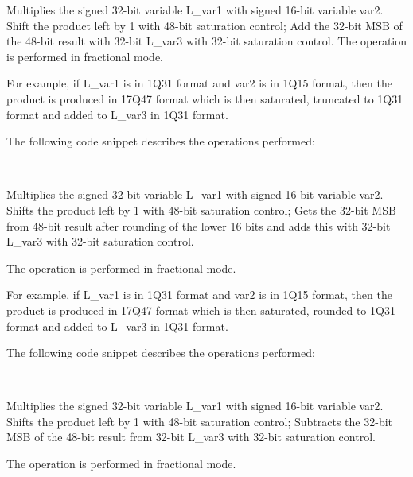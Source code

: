 
Multiplies the signed 32-bit variable L\_var1 with signed 16-bit variable var2.
Shift the product left by 1 with 48-bit saturation control; Add the 32-bit MSB of the 48-bit result with 32-bit L\_var3 with 32-bit saturation control.
The operation is performed in fractional mode.

For example, if L\_var1 is in 1Q31 format and var2 is in 1Q15 format, then the product is produced in 17Q47 format which is then saturated, truncated to 1Q31 format and added to L\_var3 in 1Q31 format.

The following code snippet describes the operations performed:

\\


Multiplies the signed 32-bit variable L\_var1 with signed 16-bit variable var2.
Shifts the product left by 1 with 48-bit saturation control;
Gets the 32-bit MSB from 48-bit result after rounding of the lower 16 bits and adds this with 32-bit L\_var3 with 32-bit saturation control.

The operation is performed in fractional mode.

For example, if L\_var1 is in 1Q31 format and var2 is in 1Q15 format, then the product is produced in 17Q47 format which is then saturated, rounded to 1Q31 format and added to L\_var3 in 1Q31 format.

The following code snippet describes the operations performed:

\\


Multiplies the signed 32-bit variable L\_var1 with signed 16-bit variable var2.
Shifts the product left by 1 with 48-bit saturation control; Subtracts the 32-bit MSB of the 48-bit result from 32-bit L\_var3 with 32-bit saturation control.

The operation is performed in fractional mode.

